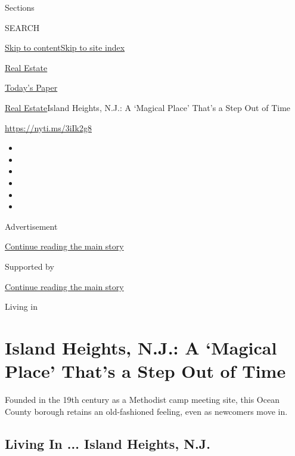 Sections

SEARCH

\protect\hyperlink{site-content}{Skip to
content}\protect\hyperlink{site-index}{Skip to site index}

\href{https://www.nytimes.com/section/realestate}{Real Estate}

\href{https://myaccount.nytimes.com/auth/login?response_type=cookie\&client_id=vi}{}

\href{https://www.nytimes.com/section/todayspaper}{Today's Paper}

\href{/section/realestate}{Real Estate}\textbar{}Island Heights, N.J.: A
`Magical Place' That's a Step Out of Time

\url{https://nyti.ms/3iIk2g8}

\begin{itemize}
\item
\item
\item
\item
\item
\item
\end{itemize}

Advertisement

\protect\hyperlink{after-top}{Continue reading the main story}

Supported by

\protect\hyperlink{after-sponsor}{Continue reading the main story}

Living in

\hypertarget{island-heights-nj-a-magical-place-thats-a-step-out-of-time}{%
\section{Island Heights, N.J.: A `Magical Place' That's a Step Out of
Time}\label{island-heights-nj-a-magical-place-thats-a-step-out-of-time}}

Founded in the 19th century as a Methodist camp meeting site, this Ocean
County borough retains an old-fashioned feeling, even as newcomers move
in.

\href{https://www.nytimes.com/slideshow/2020/07/08/realestate/living-in-island-heights-nj.html}{}

\hypertarget{living-in--island-heights-nj}{%
\subsection{Living In ... Island Heights,
N.J.}\label{living-in--island-heights-nj}}


